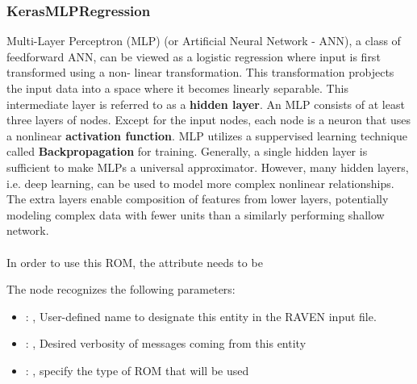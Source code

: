 \subsubsection{KerasMLPRegression}
  Multi-Layer Perceptron (MLP) (or Artificial Neural Network - ANN), a class of feedforward
  ANN, can be viewed as a logistic regression where input is first transformed         using a non-
  linear transformation. This transformation probjects the input data into a         space where it
  becomes linearly separable. This intermediate layer is referred to as a         \textbf{hidden
  layer}. An MLP consists of at least three layers of nodes. Except for the         input nodes,
  each node is a neuron that uses a nonlinear \textbf{activation function}. MLP         utilizes a
  suppervised learning technique called \textbf{Backpropagation} for training.         Generally, a
  single hidden layer is sufficient to make MLPs a universal approximator.         However, many
  hidden layers, i.e. deep learning, can be used to model more complex nonlinear
  relationships. The extra layers enable composition of features from lower layers, potentially
  modeling complex data with fewer units than a similarly performing shallow network.         \\
           \\         In order to use this ROM, the
   attribute  needs to         be 

  The  node recognizes the following parameters:
    \begin{itemize}
      \item {}: , 
        User-defined name to designate this entity in the RAVEN input file.
      \item {}: , 
        Desired verbosity of messages coming from this entity
      \item {}: , 
        specify the type of ROM that will be used
  \end{itemize}

